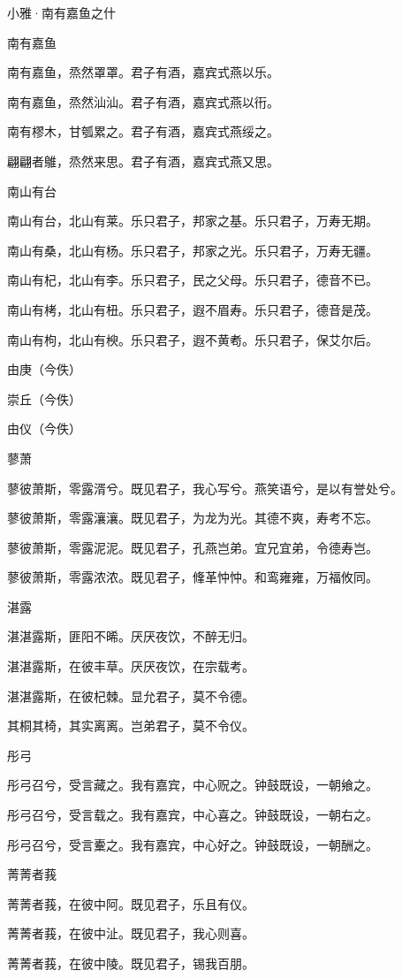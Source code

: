小雅·南有嘉鱼之什


南有嘉鱼

南有嘉鱼，烝然罩罩。君子有酒，嘉宾式燕以乐。

南有嘉鱼，烝然汕汕。君子有酒，嘉宾式燕以衎。

南有樛木，甘瓠累之。君子有酒，嘉宾式燕绥之。

翩翩者鵻，烝然来思。君子有酒，嘉宾式燕又思。

南山有台

南山有台，北山有莱。乐只君子，邦家之基。乐只君子，万寿无期。

南山有桑，北山有杨。乐只君子，邦家之光。乐只君子，万寿无疆。

南山有杞，北山有李。乐只君子，民之父母。乐只君子，德音不已。

南山有栲，北山有杻。乐只君子，遐不眉寿。乐只君子，德音是茂。

南山有枸，北山有楰。乐只君子，遐不黄耇。乐只君子，保艾尔后。

由庚（今佚）

崇丘（今佚）

由仪（今佚）

蓼萧

蓼彼萧斯，零露湑兮。既见君子，我心写兮。燕笑语兮，是以有誉处兮。

蓼彼萧斯，零露瀼瀼。既见君子，为龙为光。其德不爽，寿考不忘。

蓼彼萧斯，零露泥泥。既见君子，孔燕岂弟。宜兄宜弟，令德寿岂。

蓼彼萧斯，零露浓浓。既见君子，鞗革忡忡。和鸾雍雍，万福攸同。

湛露

湛湛露斯，匪阳不晞。厌厌夜饮，不醉无归。

湛湛露斯，在彼丰草。厌厌夜饮，在宗载考。

湛湛露斯，在彼杞棘。显允君子，莫不令德。

其桐其椅，其实离离。岂弟君子，莫不令仪。

彤弓

彤弓召兮，受言藏之。我有嘉宾，中心贶之。钟鼓既设，一朝飨之。

彤弓召兮，受言载之。我有嘉宾，中心喜之。钟鼓既设，一朝右之。

彤弓召兮，受言櫜之。我有嘉宾，中心好之。钟鼓既设，一朝酬之。

菁菁者莪

菁菁者莪，在彼中阿。既见君子，乐且有仪。

菁菁者莪，在彼中沚。既见君子，我心则喜。

菁菁者莪，在彼中陵。既见君子，锡我百朋。

